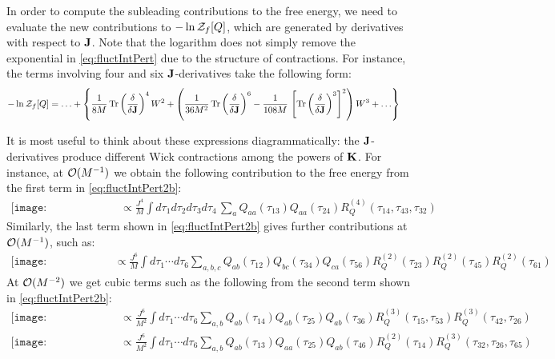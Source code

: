\documentclass[aps,prx,preprint,onecolumn,citeautoscript,superscriptaddress,nofootinbib,
eqsecnum]{revtex4}
\begin{document}
{In order to compute the subleading contributions to the free energy, we need to evaluate the new contributions to $-\ln {\cal Z}_f[Q]$, which are generated by derivatives with respect to ${\bf J}$. Note that the logarithm does not simply remove the exponential in \eqref{eq:fluctIntPert} due to the structure of contractions. For instance, the terms involving four and six ${\bf J}$-derivatives take the following form:
\begin{equation}
\label{eq:fluctIntPert2b}
\begin{split}
-\ln {\cal Z}_f[Q] 
&= \ldots  + \left\{ \frac{1}{8M} \, \text{Tr} \left(  \frac{\delta}{\delta {\bf J}} \right)^4 W^2 +  \left( \frac{1}{36M^2} \, \text{Tr} \left(  \frac{\delta}{\delta {\bf J}}\right)^6
- \frac{1}{108 M} \, \left[\text{Tr} \left(  \frac{\delta}{\delta {\bf J}} \right)^3 \right]^2 \right) W^3 + \ldots \right\}
\end{split}
 \end{equation}

 
It is most useful to think about these expressions diagrammatically: the ${\bf J}$-derivatives produce different Wick contractions among the powers of ${\bf K}$.
For instance, at ${\cal O}(M^{-1})$ we obtain the following contribution to the free energy from the first term in \eqref{eq:fluctIntPert2b}:
\begin{equation}
\label{eq:higherCorr1}
 \begin{split} 
\texttt{[image: subleading31a.pdf]} 
  &\propto \frac{J^4}{M} \int d\tau_1 d\tau_2d\tau_3d\tau_4 \, \sum_a Q_{aa}(\tau_{13}) Q_{aa}(\tau_{24}) R_Q^{(4)}(\tau_{14},\tau_{43},\tau_{32}) 
\end{split}
\end{equation}  
Similarly, the last term shown in \eqref{eq:fluctIntPert2b} gives further contributions at ${\cal O}(M^{-1})$, such as:
\begin{equation}
\label{eq:cubic1}
\begin{split} 
\texttt{[image: subleading2b.pdf]} &\propto  \frac{J^6}{M} \int d\tau_1\cdots d\tau_6 \sum_{a,b,c}  Q_{ab}(\tau_{12}) Q_{bc}(\tau_{34})Q_{ca}(\tau_{56}) R_Q^{(2)}(\tau_{23}) R_Q^{(2)}(\tau_{45}) R_Q^{(2)}(\tau_{61})
\end{split}
\end{equation} 
At ${\cal O}(M^{-2})$ we get cubic terms such as the following from the second term shown in \eqref{eq:fluctIntPert2b}:
\begin{equation}
\label{eq:cubicDiags}
 \begin{split} 
\texttt{[image: subleading32a.pdf]} 
  &\propto \frac{J^6}{M^2} \int d\tau_1 \cdots d\tau_6 \sum_{a,b} Q_{ab}(\tau_{14}) Q_{ab}(\tau_{25}) Q_{ab}(\tau_{36}) R_Q^{(3)}(\tau_{15},\tau_{53}) R_Q^{(3)}(\tau_{42},\tau_{26})\\
\texttt{[image: subleading32b.pdf]} 
  &\propto \frac{J^6}{M^2} \int d\tau_1 \cdots d\tau_6 \sum_{a,b}  Q_{ab}(\tau_{13}) Q_{aa}(\tau_{25}) Q_{ab}(\tau_{46}) R_Q^{(2)}(\tau_{14}) R_Q^{(3)}(\tau_{32},\tau_{26},\tau_{65})
\end{split}
\end{equation} 

}
\end{document}
